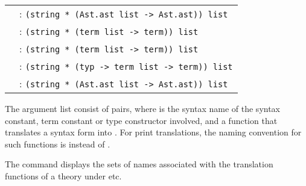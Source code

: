 \begin{isabellebody}
\begin{isamarkuptext}
\begin{description}
  \medskip
  {\footnotesize
  \begin{tabular}{ll}
  \hyperlink{command.parse-ast-translation}{\mbox{\isa{\isacommand{parse{\isaliteral{5F}{\isacharunderscore}}ast{\isaliteral{5F}{\isacharunderscore}}translation}}}} & : \verb|(string * (Ast.ast list -> Ast.ast)) list| \\
  \hyperlink{command.parse-translation}{\mbox{\isa{\isacommand{parse{\isaliteral{5F}{\isacharunderscore}}translation}}}} & : \verb|(string * (term list -> term)) list| \\
  \hyperlink{command.print-translation}{\mbox{\isa{\isacommand{print{\isaliteral{5F}{\isacharunderscore}}translation}}}} & : \verb|(string * (term list -> term)) list| \\
  \hyperlink{command.typed-print-translation}{\mbox{\isa{\isacommand{typed{\isaliteral{5F}{\isacharunderscore}}print{\isaliteral{5F}{\isacharunderscore}}translation}}}} & : \verb|(string * (typ -> term list -> term)) list| \\
  \hyperlink{command.print-ast-translation}{\mbox{\isa{\isacommand{print{\isaliteral{5F}{\isacharunderscore}}ast{\isaliteral{5F}{\isacharunderscore}}translation}}}} & : \verb|(string * (Ast.ast list -> Ast.ast)) list| \\
  \end{tabular}}
  \medskip

  The argument list consist of  pairs, where  is the syntax name of the syntax constant, term constant or
  type constructor involved, and  a function that
  translates a syntax form  into .
  For print translations, the naming convention for such functions is
   instead of .

  The \hyperlink{command.print-syntax}{\mbox{}} command displays the sets of names
  associated with the translation functions of a theory under  etc.


\end{description}
\end{isamarkuptext}
\end{isabellebody}
